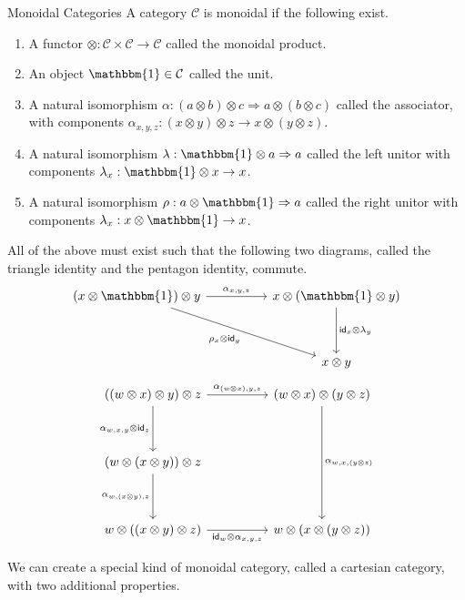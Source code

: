 \documentclass[12pt]{article}
\begin{document}
\begin{definition}{Monoidal Categories}{}
    A category $\mathcal{C}$ is monoidal if the following exist.
    \begin{enumerate}
        \item A functor $\otimes:\mathcal{C}\times\mathcal{C}\rightarrow\mathcal{C}$ called the monoidal product.
        \item An object $\mathbbm{1}\in\mathcal{C}$ called the unit.
        \item A natural isomorphism $\alpha : (a\otimes b)\otimes c\Rightarrow a\otimes (b\otimes c)$ called the associator, with components $\alpha_{x,y,z}: (x\otimes y)\otimes z\rightarrow x\otimes (y\otimes z)$.
        \item A natural isomorphism $\lambda : \mathbbm{1}\otimes a\Rightarrow a$ called the left unitor with components $\lambda_x : \mathbbm{1}\otimes x\rightarrow x$.
        \item A natural isomorphism $\rho : a\otimes \mathbbm{1}\Rightarrow a$ called the right unitor with components $\lambda_x : x\otimes \mathbbm{1}\rightarrow x$.
    \end{enumerate}
    All of the above must exist such that the following two diagrams, called the triangle identity and the pentagon identity, commute.
    \[\begin{tikzcd}
            {(x\otimes\mathbbm{1})\otimes y} && {x\otimes(\mathbbm{1}\otimes y)} \\
            \\
            && {x\otimes y}
            \arrow["{{\rho_x\otimes \mathsf{id}_y}}"', from=1-1, to=3-3]
            \arrow["{{\mathsf{id}_x\otimes\lambda_y}}", from=1-3, to=3-3]
            \arrow["{{\alpha_{x,y,z}}}", from=1-1, to=1-3]
        \end{tikzcd}\]
    \[\begin{tikzcd}
            {((w\otimes x)\otimes y)\otimes z} && {(w\otimes x)\otimes(y\otimes z)} \\
            \\
            {(w\otimes (x\otimes y))\otimes z} \\
            \\
            {w\otimes ((x\otimes y)\otimes z)} && {w\otimes (x\otimes (y\otimes z))}
            \arrow["{{\alpha_{w,x,(y\otimes z)}}}", from=1-3, to=5-3]
            \arrow["{{\alpha_{(w\otimes x),y,z}}}", from=1-1, to=1-3]
            \arrow["{{\alpha_{w,x,y}\otimes \mathsf{id}_z}}"', from=1-1, to=3-1]
            \arrow["{{\alpha_{w,(x\otimes y),z}}}"', from=3-1, to=5-1]
            \arrow["{{\mathsf{id}_w\otimes \alpha_{x,y,z}}}"', from=5-1, to=5-3]
        \end{tikzcd}\]
\end{definition}
We can create a special kind of monoidal category, called a cartesian category, with two additional properties.
\end{document}
